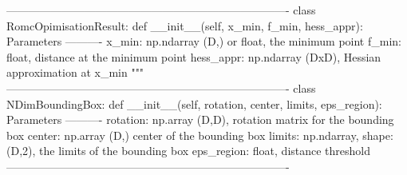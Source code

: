 \begin{Code}
----------------------------------------------------------------------------
class RomcOpimisationResult:
    def __init__(self, x_min, f_min, hess_appr):
        Parameters
        ----------
        x_min: np.ndarray (D,) or float, the minimum point
        f_min: float, distance at the minimum point
        hess_appr: np.ndarray (DxD), Hessian approximation at x_min
        """
----------------------------------------------------------------------------
class NDimBoundingBox:
    def __init__(self, rotation, center, limits, eps_region):
        Parameters
        ----------
        rotation: np.array (D,D),  rotation matrix for the bounding box
        center: np.array (D,) center of the bounding box
        limits: np.ndarray, shape: (D,2), the limits of the bounding box
        eps_region: float, distance threshold
----------------------------------------------------------------------------
\end{Code}
